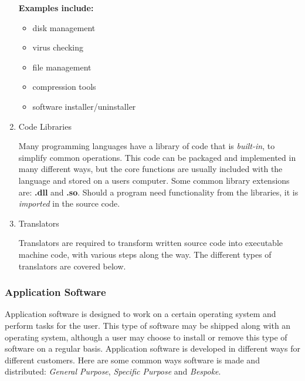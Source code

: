 \documentclass[9pt]{article}
\begin{document}
\begin{enumerate}
\textbf{Examples include:}

\begin{itemize}
\item disk management
\item virus checking
\item file management
\item compression tools
\item software installer/uninstaller
\end{itemize}

\item Code Libraries
\label{sec:org5dd3dd4}

Many programming languages have a library of code that is \emph{built-in}, to simplify common operations. This code can be packaged and implemented in many different ways, but the core functions are usually included with the language and stored on a users computer. Some common library extensions are: \textbf{.dll} and \textbf{.so}. Should a program need functionality from the libraries, it is \emph{imported} in the source code.

\item Translators
\label{sec:org2b7c235}

Translators are required to transform written source code into executable machine code, with various steps along the way. The different types of translators are covered below.
\end{enumerate}

\subsubsection{Application Software}
\label{sec:orgd568491}

Application software is designed to work on a certain operating system and perform tasks for the user. This type of software may be shipped along with an operating system, although a user may choose to install or remove this type of software on a regular basis. Application software is developed in different ways for different customers. Here are some common ways software is made and distributed: \emph{General Purpose}, \emph{Specific Purpose} and \emph{Bespoke}.
\end{document}
